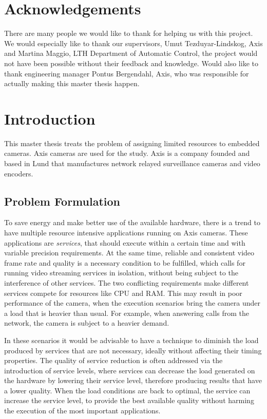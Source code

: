 \documentclass[nobiblatex]{LTHthesis}
\begin{document}
\chapter*{Acknowledgements}

There are many people we would like to thank for helping us with this project. We would especially like to thank our supervisors, Umut Tezduyar-Lindskog, Axis and Martina Maggio, LTH Department of Automatic Control, the project would not have been possible without their feedback and knowledge. Would also like to thank engineering manager Pontus Bergendahl, Axis, who was responsible for actually making this master thesis happen.


\tableofcontents
\newpage

\setcounter{page}{1}

\chapter{Introduction}

This master thesis treats the problem of assigning limited resources to
embedded cameras. Axis cameras are used for the study. Axis is a company
founded and based in Lund that manufactures network relayed surveillance
cameras and video encoders.

\section{Problem Formulation}

To save energy and make better use of the available hardware, there is a
trend to have multiple resource intensive applications running on Axis
cameras. These applications are \emph{services}, that should execute within
a certain time and with variable precision requirements. At the same time,
reliable and consistent video frame rate and quality is a necessary
condition to be fulfilled, which calls for running video streaming
services in isolation, without being subject to the interference of
other services. The two conflicting requirements make different services 
compete for resources like CPU and RAM. This may result in poor performance 
of the camera, when the execution scenarios bring the camera under a load
that is heavier than usual. For example, when answering calls
from the network, the camera is subject to a heavier demand. 

In these scenarios it would be advisable to have a technique to diminish
the load produced by services that are not necessary, ideally without
affecting their timing properties. The quality of service reduction is
often addressed via the introduction of service levels, where services can
decrease the load generated on the hardware by lowering their service level,
therefore producing results that have a lower quality. When the load
conditions are back to optimal, the service can increase the service level,
to provide the best available quality without harming the execution of the
most important applications.
\end{document}
